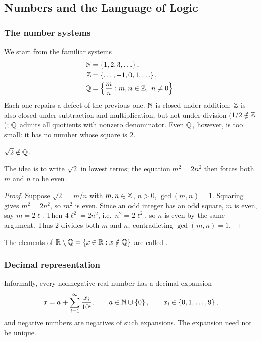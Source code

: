 \subsection{Numbers and the Language of Logic}

\subsubsection{The number systems}
We start from the familiar systems
\begin{align*}
    \mathbb{N} &= \left\{1,2,3,\ldots\right\}, \\
    \mathbb{Z} &= \left\{\ldots,-1,0,1,\ldots\right\}, \\
    \mathbb{Q} &= \left\{\frac{m}{n} : m,n\in\mathbb{Z},\ n\ne 0\right\}.
\end{align*}
Each one repairs a defect of the previous one. $\mathbb{N}$ is closed under
addition; $\mathbb{Z}$ is also closed under subtraction and multiplication, but not
under division ($1/2\notin\mathbb{Z}$); $\mathbb{Q}$ admits all quotients with nonzero
denominator. Even $\mathbb{Q}$, however, is too small: it has no number whose square
is $2$.

\begin{theorem}\label{thm:sqrt2-irrational}
    $\sqrt{2}\notin\mathbb{Q}$.
\end{theorem}

The idea is to write $\sqrt2$ in lowest terms; the equation $m^2=2n^2$ then
forces both $m$ and $n$ to be even.

\begin{proof}
    Suppose $\sqrt2=m/n$ with $m,n\in\mathbb{Z}$, $n>0$, $\gcd(m,n)=1$. Squaring
    gives $m^2=2n^2$, so $m^2$ is even. Since an odd integer has an odd
    square, $m$ is even, say $m=2\ell$. Then $4\ell^2=2n^2$, i.e.\
    $n^2=2\ell^2$, so $n$ is even by the same argument. Thus $2$ divides
    both $m$ and $n$, contradicting $\gcd(m,n)=1$.
\end{proof}

The elements of $\mathbb{R}\setminus\mathbb{Q}=\left\{x\in\mathbb{R} : x\notin\mathbb{Q}\right\}$ are called
\term{irrational numbers}.

\subsubsection{Decimal representation}
Informally, every nonnegative real number has a decimal expansion
\begin{equation*}
    x=a+\sum_{i=1}^{\infty}\frac{x_i}{10^i},
    \qquad a\in\mathbb{N}\cup\left\{0\right\},
    \qquad x_i\in\left\{0,1,\ldots,9\right\},
\end{equation*}
and negative numbers are negatives of such expansions. The expansion need
not be unique.

